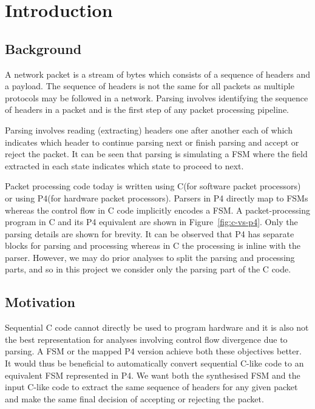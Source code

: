 
\chapter{Introduction}
\label{ch:introduction}

\section{Background}
\label{sec:background}
A network packet is a stream of bytes which consists of a sequence of headers and a payload. The sequence of headers is not the same for all packets as multiple protocols may be followed in a network. Parsing involves identifying the sequence of headers in a packet and is the first step of any packet processing pipeline.

Parsing involves reading (extracting) headers one after another each of which indicates which header to continue parsing next or finish parsing and accept or reject the packet. It can be seen that parsing is simulating a FSM where the field extracted in each state indicates which state to proceed to next.

Packet processing code today is written using C(for software packet processors) or using P4(for hardware packet processors). Parsers in P4 directly map to FSMs whereas the control flow in C code implicitly encodes a FSM. A packet-processing program in C and its P4 equivalent are shown in
Figure~\ref{fig:c-vs-p4}. Only the parsing details are shown for brevity. It can be observed that P4 has separate blocks for parsing and processing whereas in
C the processing is inline with the parser. However, we may do prior analyses to split the parsing and processing parts, and so in this project
we consider only the parsing part of the C code.
\section{Motivation}
\label{sec:motivation}
Sequential C code cannot directly be used to program hardware and it is also not the best representation for analyses involving control flow divergence due to parsing. A FSM or the mapped P4 version achieve both these objectives better.
It would thus be beneficial to automatically convert sequential C-like code to an equivalent FSM represented in P4. We want both the synthesised FSM and the input C-like code to extract the same sequence of headers for any given packet and make the same final decision of accepting or rejecting the packet.
